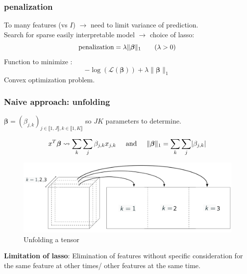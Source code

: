 \documentclass{beamer}
\begin{document}
\begin{frame}
    \frametitle{penalization}
    To many features (vs $I$) $\rightarrow$ need to limit variance of prediction.\\[10 pt]
    Search for sparse easily interpretable model $\rightarrow$ choice of lasso: $$\text{penalization} = \lambda \lVert \bm{\beta} \rVert_1 \hspace{0.7 cm} (\lambda >0)$$
    Function to minimize : 
    $$- \log(\mathcal{L}(\bm{\beta})) + \lambda \lVert \bm{\beta} \rVert_1 $$
    Convex optimization problem.

    
\end{frame}

\begin{frame}
    \frametitle{Naive approach: unfolding}
    \begin{center}
    $\bm{\beta} = (\beta_{j,k})_{j \in \llbracket 1, J\rrbracket, k \in \llbracket 1, K\rrbracket}$ so $JK$ parameters to determine.\\[15 pt]
    \end{center}
    $$x^T \bm{\beta} \leadsto \sum\limits_{k}\sum\limits_{j}  \beta_{j,k} x_{j,k} \hspace{0.5 cm} \text{and} \hspace{0.5 cm} \lVert \bm{\beta} \rVert_1 = \sum\limits_{k}\sum\limits_{j} \lvert \beta_{j,k} \rvert$$
    \begin{figure}
        \centering
        \includegraphics[scale = 0.15]{images/deplier.png}
        \caption{Unfolding a tensor}
    \end{figure}
    \textbf{Limitation of lasso}: Elimination of features without specific consideration for the same feature at other times/ other features at the same time.
    
\end{frame}
\end{document}
